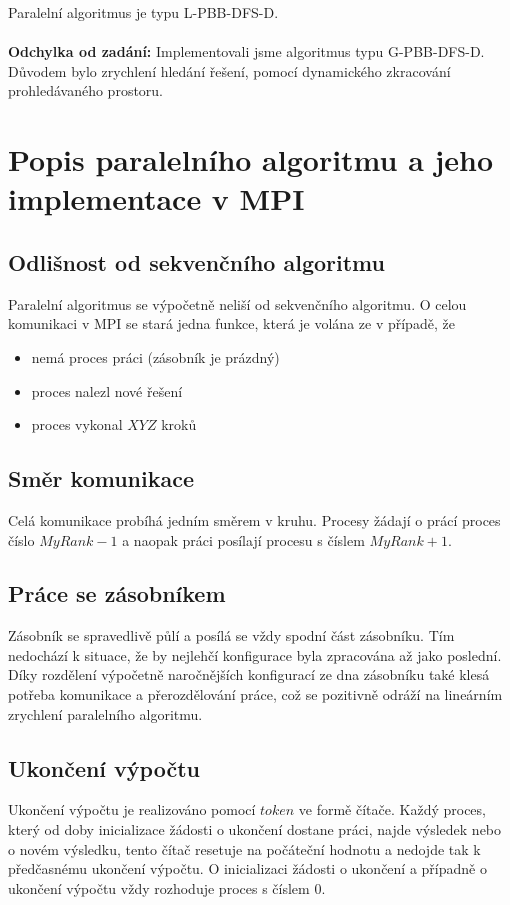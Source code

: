 \documentclass[12pt,a4paper]{article}
\begin{document}
Paralelní algoritmus je typu L-PBB-DFS-D.\\
\\
\textbf{Odchylka od zadání:} Implementovali jsme algoritmus typu G-PBB-DFS-D. Důvodem bylo zrychlení hledání řešení, pomocí dynamického zkracování prohledávaného prostoru.



\section{Popis paralelního algoritmu a jeho implementace v MPI}

\subsection{Odlišnost od sekvenčního algoritmu}
Paralelní algoritmus se výpočetně neliší od sekvenčního algoritmu. O celou komunikaci v MPI se stará jedna funkce, která je volána ze  v případě, že
\begin{itemize}
\item nemá proces práci (zásobník je prázdný)
\item proces nalezl nové řešení 
\item proces vykonal $ XYZ $ kroků
\end{itemize}
\medskip

\subsection{Směr komunikace}
Celá komunikace probíhá jedním směrem v kruhu. Procesy žádají o prácí proces číslo $ MyRank - 1 $ a naopak práci posílají procesu s číslem $ MyRank + 1 $.\\

\subsection{Práce se zásobníkem}
Zásobník se spravedlivě půlí a posílá se vždy spodní část zásobníku. Tím nedochází k situace, že by nejlehčí konfigurace byla zpracována až jako poslední. Díky rozdělení výpočetně naročnějších konfigurací ze dna zásobníku také klesá potřeba komunikace a přerozdělování práce, což se pozitivně odráží na lineárním zrychlení paralelního algoritmu.\\

\subsection{Ukončení výpočtu}
Ukončení výpočtu je realizováno pomocí $ token $ ve formě čítače. Každý proces, který od doby inicializace žádosti o ukončení dostane práci, najde výsledek nebo  o novém výsledku, tento čítač resetuje na počáteční hodnotu a nedojde tak k předčasnému ukončení výpočtu. O inicializaci žádosti o ukončení a případně o ukončení výpočtu vždy rozhoduje proces s číslem $0$.\\
\end{document}
